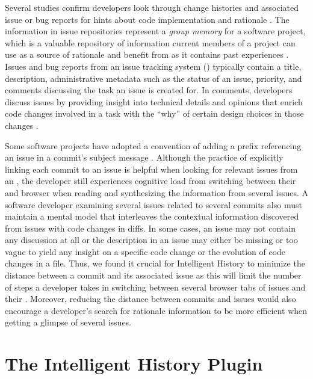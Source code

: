 Several studies confirm developers look through change histories and associated issue or bug reports for hints about code implementation and rationale \cite{ko_information_2007,robillard_turnover-induced_2021, rastkar_why_2013}.
The information in issue repositories represent a \emph{group memory} for a software project, which is a valuable repository of information current members of a project can use as a source of rationale and benefit from as it contains past experiences \cite{cubranic_hipikat_2003,hassan_road_2008}.
Issues and bug reports from an issue tracking system () typically contain a title, description, administrative metadata such as the status of an issue, priority, and comments discussing the task an issue is created for.
In comments, developers discuss issues by providing insight into technical details and opinions that enrich code changes involved in a task with the ``why'' of certain design choices in those changes \cite{ortu_jira_2015}.

Some software projects have adopted a convention of adding a prefix referencing an issue in a commit's subject message \cite{rastkar_why_2013,moreno_arena_2017}.
Although the practice of explicitly linking each commit to an issue is helpful when looking for relevant issues from an , the developer still experiences cognitive load from switching between their  and browser when reading and synthesizing the information from several issues.
A software developer examining several issues related to several commits also must maintain a mental model that interleaves the contextual information discovered from issues with code changes in diffs.
In some cases, an issue may not contain any discussion at all or the description in an issue may either be missing or too vague to yield any insight on a specific code change or the evolution of code changes in a file.
Thus, we found it crucial for Intelligent History to minimize the distance between a commit and its associated issue as this will limit the number of steps a developer takes in switching between several browser tabs of issues and their .
Moreover, reducing the distance between commits and issues would also encourage a developer's search for rationale information to be more efficient when getting a glimpse of several issues.

\section{The Intelligent History Plugin}
\label{sec:Implementation}

